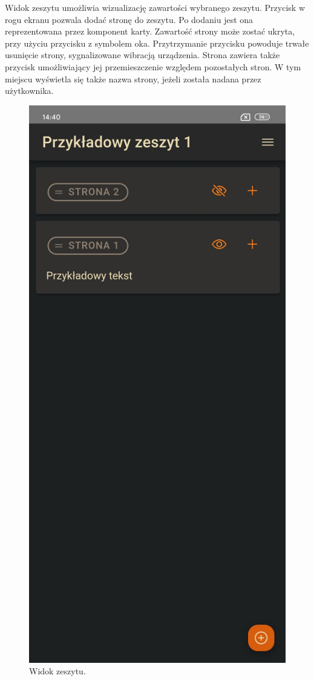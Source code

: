 Widok zeszytu umożliwia wizualizację zawartości wybranego zeszytu. Przycisk w rogu ekranu pozwala dodać stronę do zeszytu.
Po dodaniu jest ona reprezentowana przez komponent karty. Zawartość strony może zostać ukryta,
przy użyciu przycisku z symbolem oka. Przytrzymanie przycisku powoduje trwałe usunięcie strony, sygnalizowane wibracją urządzenia.
Strona zawiera także przycisk umożliwiający jej przemieszczenie względem pozostałych stron. W tym miejscu wyświetla się także nazwa
strony, jeżeli została nadana przez użytkownika.
\begin{figure}[H]
	\begin{center}
		\includegraphics[scale=0.2]{media/BookView.jpg}
	\end{center}
	\caption{Widok zeszytu.}
	\label{rys:book-view}
\end{figure}

